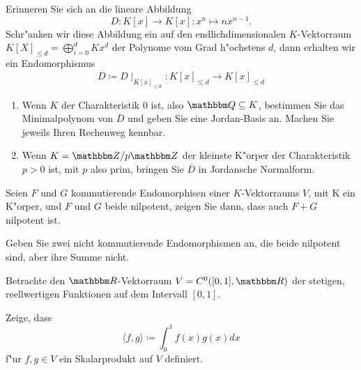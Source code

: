 \documentclass[a4,11pt]{article}
\begin{document}
\vspace*{-17mm}
{
\kopf
}


\begin{aufgabe}[4 Punkte]

Erinneren Sie sich an die lineare Abbildung
\[
D : K[x] \rightarrow K[x] : x^n \mapsto nx^{n-1}.
\]
Schr"anken wir diese Abbildung ein auf den endlichdimensionalen $K$-Vektorraum $K[X]_{\leq d} = \bigoplus_{i = 0}^d Kx^d$ der Polynome vom Grad h"ochstens $d$, dann erhalten wir ein Endomorphismus
\[
\overline{D} \coloneqq D\mid_{K[x]_{\leq d}} : K[x]_{\leq d} \rightarrow K[x]_{\leq d}
\]
  
\begin{enumerate}
\item Wenn $K$ der Charakteristik $0$ ist, also $\Q \subseteq K$, bestimmen Sie das Minimalpolynom von $\overline{D}$ und geben Sie eine Jordan-Basis an. Machen Sie jeweils Ihren Rechenweg kennbar.
\item Wenn $K = \Z/p\Z$ der kleinste K"orper der Charakteristik $p > 0$ ist, mit $p$ also prim, bringen Sie $\overline{D}$ in Jordansche Normalform.
\end{enumerate}

\end{aufgabe}

\begin{aufgabe}[4 Punkte]

Seien $F$ und $G$ kommutierende Endomorphisen einer $K$-Vektorraums $V$, mit K ein K"orper, und $F$ und $G$ beide nilpotent, zeigen Sie dann, dass auch $F+G$ nilpotent ist.

Geben Sie zwei nicht kommutierende Endomorphismen an, die beide nilpotent sind, aber ihre Summe nicht.

\end{aufgabe}


\begin{aufgabe}[4 Punkte]
Betrachte den $\R$-Vektorraum $V=C^0([0,1],\R)$ der stetigen,
reellwertigen Funktionen auf dem Intervall $[0,1]$.

Zeige, dass
$$
\langle f,g \rangle \coloneqq \int_0^1 f(x)g(x) dx
$$
f"ur $f,g \in V$ ein Skalarprodukt auf $V$ definiert.

\end{aufgabe}
\end{document}
